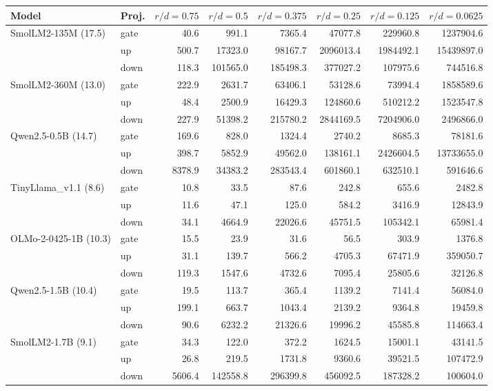 \begin{tabular}{llrrrrrr}
\toprule
Model & Proj. & $r/d=0.75$ & $r/d=0.5$ & $r/d=0.375$ & $r/d=0.25$ & $r/d=0.125$ & $r/d=0.0625$ \\
\midrule
SmolLM2-135M (17.5) & gate & 40.6 & 991.1 & 7365.4 & 47077.8 & 229960.8 & 1237904.6 \\
 & up & 500.7 & 17323.0 & 98167.7 & 2096013.4 & 1984492.1 & 15439897.0 \\
 & down & 118.3 & 101565.0 & 185498.3 & 377027.2 & 107975.6 & 744516.8 \\
\midrule
SmolLM2-360M (13.0) & gate & 222.9 & 2631.7 & 63406.1 & 53128.6 & 73994.4 & 1858589.6 \\
 & up & 48.4 & 2500.9 & 16429.3 & 124860.6 & 510212.2 & 1523547.8 \\
 & down & 227.9 & 51398.2 & 215780.2 & 2844169.5 & 7204906.0 & 2496866.0 \\
\midrule
Qwen2.5-0.5B (14.7) & gate & 169.6 & 828.0 & 1324.4 & 2740.2 & 8685.3 & 78181.6 \\
 & up & 398.7 & 5852.9 & 49562.0 & 138161.1 & 2426604.5 & 13733655.0 \\
 & down & 8378.9 & 34383.2 & 283543.4 & 601860.1 & 632510.1 & 591646.6 \\
\midrule
TinyLlama\_v1.1 (8.6) & gate & 10.8 & 33.5 & 87.6 & 242.8 & 655.6 & 2482.8 \\
 & up & 11.6 & 47.1 & 125.0 & 584.2 & 3416.9 & 12843.9 \\
 & down & 34.1 & 4664.9 & 22026.6 & 45751.5 & 105342.1 & 65981.4 \\
\midrule
OLMo-2-0425-1B (10.3) & gate & 15.5 & 23.9 & 31.6 & 56.5 & 303.9 & 1376.8 \\
 & up & 31.1 & 139.7 & 566.2 & 4705.3 & 67471.9 & 359050.7 \\
 & down & 119.3 & 1547.6 & 4732.6 & 7095.4 & 25805.6 & 32126.8 \\
\midrule
Qwen2.5-1.5B (10.4) & gate & 19.5 & 113.7 & 365.4 & 1139.2 & 7141.4 & 56084.0 \\
 & up & 199.1 & 663.7 & 1043.4 & 2139.2 & 9364.8 & 19459.8 \\
 & down & 90.6 & 6232.2 & 21326.6 & 19996.2 & 45585.8 & 114663.4 \\
\midrule
SmolLM2-1.7B (9.1) & gate & 34.3 & 122.0 & 372.2 & 1624.5 & 15001.1 & 43141.5 \\
 & up & 26.8 & 219.5 & 1731.8 & 9360.6 & 39521.5 & 107472.9 \\
 & down & 5606.4 & 142558.8 & 296399.8 & 456092.5 & 187328.2 & 100604.0 \\
\bottomrule
\end{tabular}

